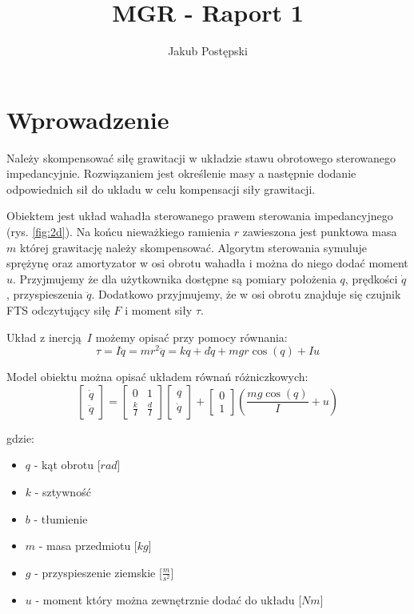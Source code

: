 \documentclass[a4paper, 10pt]{article}
\title{MGR - Raport 1}
\author{Jakub Postępski}
\begin{document}
\maketitle

\section{Wprowadzenie}
Należy skompensować siłę grawitacji w układzie stawu obrotowego sterowanego impedancyjnie. Rozwiązaniem jest określenie masy a następnie dodanie odpowiednich sił do układu w celu kompensacji siły grawitacji.

Obiektem jest układ wahadła sterowanego prawem sterowania impedancyjnego (rys. \ref{fig:2d}). Na końcu nieważkiego ramienia $r$ zawieszona jest punktowa masa $m$ której grawitację należy skompensować. Algorytm sterowania symuluje sprężynę oraz amortyzator w osi obrotu wahadła i można do niego dodać moment $u$.  Przyjmujemy że dla użytkownika dostępne są pomiary położenia $q$, prędkości $\dot{q}$, przyspieszenia $\ddot{q}$. Dodatkowo przyjmujemy, że w osi obrotu znajduje się czujnik FTS odczytujący siłę $F$ i moment siły $\tau$.

Układ z inercją $I$ możemy opisać przy pomocy równania:
\begin{equation}
\label{eq:intro}
\tau = I\ddot{q} = mr^2\ddot{q} = kq + d\dot{q} + mgr\cos{(q)} + Iu
\end{equation}

Model obiektu można opisać układem równań różniczkowych:
\label{eq:intro2}
\begin{equation}
	\begin{bmatrix}
	    \dot{q} \\
	    \ddot{q}
	\end{bmatrix}
	=
	\begin{bmatrix}
	    0 & 1 \\
	    \frac{k}{I} & \frac{d}{I}
	\end{bmatrix}
	\begin{bmatrix}
		q \\
	    \dot{q}
	\end{bmatrix}
	+
	\begin{bmatrix}
	    0 \\
	    1
	\end{bmatrix}
	(\frac{mg\cos{(q)}}{I} + u)
\end{equation}

gdzie:
\begin{itemize}
	\item $q$ - kąt obrotu [$rad$]
	\item $k$ - sztywność
	\item $b$ - tłumienie
	\item $m$ - masa przedmiotu [$kg$]
	\item $g$ - przyspieszenie ziemskie [$\frac{m}{s^2}$]
	\item $u$ - moment który można zewnętrznie dodać do układu [$Nm$]
\end{itemize}
\end{document}
